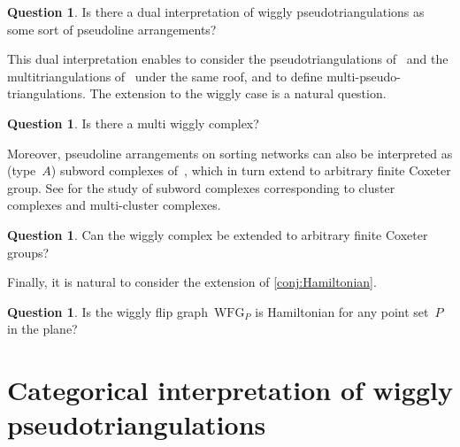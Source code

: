 \documentclass{amsart}
\theoremstyle{definition}
\newtheorem{question}[theorem]{Question}
\newcommand{\wigglyFlipGraph}{\mathrm{WFG}} %
\begin{document}
\begin{question}
Is there a dual interpretation of wiggly pseudotriangulations as some sort of pseudoline arrangements? 
\end{question}

This dual interpretation enables \cite{PilaudPocchiola} to consider the pseudotriangulations of~\cite{PocchiolaVegter,RoteSantosStreinu-pseudotriangulations} and the multitriangulations of~\cite{PilaudSantos-multitriangulations} under the same roof, and to define multi-pseudo-triangulations.
The extension to the wiggly case is a natural question.

\begin{question}
Is there a multi wiggly complex?
\end{question}

Moreover, pseudoline arrangements on sorting networks can also be interpreted as (type~$A$) subword complexes of~\cite{KnutsonMiller-subwordComplex}, which in turn extend to arbitrary finite Coxeter group.
See \cite{Stump, CeballosLabbeStump} for the study of subword complexes corresponding to cluster complexes and multi-cluster complexes.

\begin{question}
Can the wiggly complex be extended to arbitrary finite Coxeter groups?
\end{question}


Finally, it is natural to consider the extension of \cref{conj:Hamiltonian}.

\begin{question}
\label{qu:Hamiltonian}
Is the wiggly flip graph~$\wigglyFlipGraph_P$ is Hamiltonian for any point set~$P$ in the plane?
\end{question}



\section{Categorical interpretation of wiggly pseudotriangulations}
\label{sec:categoricalInterpretation}
\end{document}

